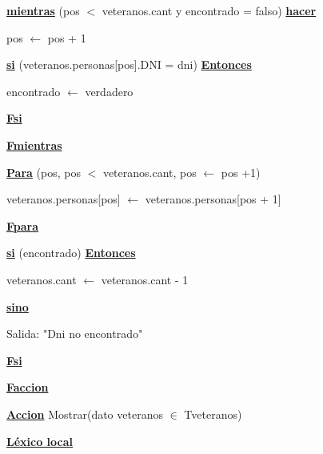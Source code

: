 \documentclass{article}
\begin{document}
            \hspace{12mm}\underline{\textbf{mientras}} (pos $<$ veteranos.cant y encontrado = falso) \underline{\textbf{hacer}}

                \hspace{16mm}pos $\leftarrow$ pos + 1

                \hspace{16mm}\underline{\textbf{si}} (veteranos.personas[pos].DNI = dni) \underline{\textbf{Entonces}}

                    \hspace{20mm}encontrado $\leftarrow$ verdadero

                \hspace{16mm}\underline{\textbf{Fsi}}

            \hspace{12mm}\underline{\textbf{Fmientras}}

            \hspace{12mm}\underline{\textbf{Para}} (pos, pos $<$ veteranos.cant, pos $\leftarrow$ pos +1)

                \hspace{16mm}veteranos.personas[pos] $\leftarrow$ veteranos.personas[pos + 1]

            \hspace{12mm}\underline{\textbf{Fpara}}

            \hspace{12mm}\underline{\textbf{si}} (encontrado) \underline{\textbf{Entonces}}

                \hspace{16mm}veteranos.cant $\leftarrow$ veteranos.cant - 1

            \hspace{12mm}\underline{\textbf{sino}}

                \hspace{16mm}Salida: "Dni no encontrado"

            \hspace{12mm}\underline{\textbf{Fsi}}

    \hspace{4mm}\underline{\textbf{Faccion}}

    \hspace{4mm}\underline{\textbf{Accion}} Mostrar(dato veteranos $\in$ Tveteranos)

        \hspace{8mm}\underline{\textbf{Léxico local}}
\end{document}
